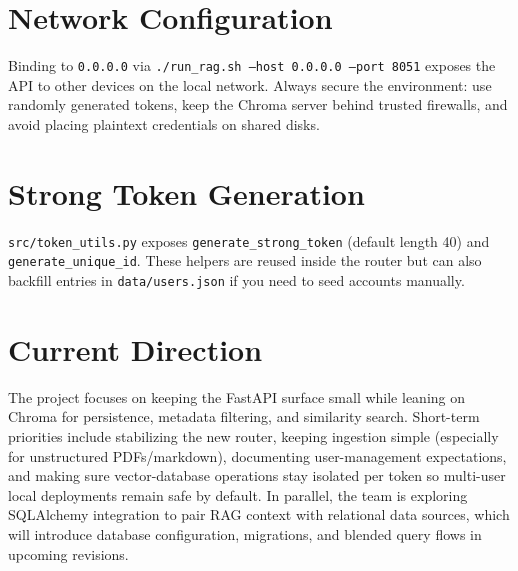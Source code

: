 \documentclass[11pt]{article}
\begin{document}
\section{Network Configuration}
Binding to \texttt{0.0.0.0} via \texttt{./run\_rag.sh --host 0.0.0.0 --port 8051} exposes the API to other devices on the local network. Always secure the environment: use randomly generated tokens, keep the Chroma server behind trusted firewalls, and avoid placing plaintext credentials on shared disks.

\section{Strong Token Generation}
\texttt{src/token\_utils.py} exposes \texttt{generate\_strong\_token} (default length 40) and \texttt{generate\_unique\_id}. These helpers are reused inside the router but can also backfill entries in \texttt{data/users.json} if you need to seed accounts manually.

\section{Current Direction}
The project focuses on keeping the FastAPI surface small while leaning on Chroma for persistence, metadata filtering, and similarity search. Short-term priorities include stabilizing the new router, keeping ingestion simple (especially for unstructured PDFs/markdown), documenting user-management expectations, and making sure vector-database operations stay isolated per token so multi-user local deployments remain safe by default. In parallel, the team is exploring SQLAlchemy integration to pair RAG context with relational data sources, which will introduce database configuration, migrations, and blended query flows in upcoming revisions.
\end{document}
